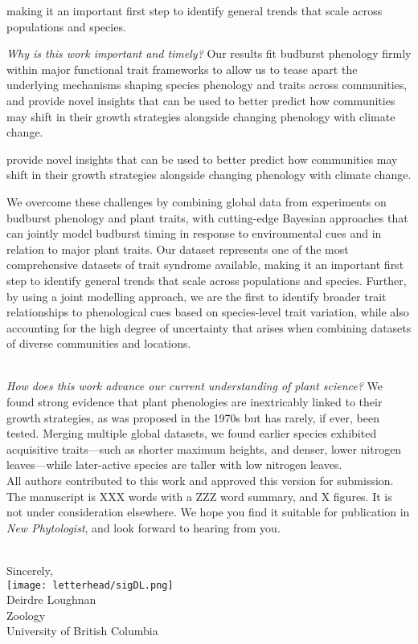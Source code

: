 \documentclass[11pt,a4paper]{article}
\begin{document}
making it an important first step to identify general trends that scale across populations and species. 

\emph{Why is this work important and timely?} Our results fit budburst phenology firmly within major functional trait frameworks to allow us to tease apart the underlying mechanisms shaping species phenology and traits across communities, and provide novel insights that can be used to better predict how communities may shift in their growth strategies alongside changing phenology with climate change. 


provide novel insights that can be used to better predict how communities may shift in their growth strategies alongside changing phenology with climate change. 


\noindent We overcome these challenges by combining global data from experiments on budburst phenology and plant traits, with cutting-edge Bayesian approaches that can jointly model budburst timing in response to environmental cues and in relation to major plant traits. Our dataset represents one of the most comprehensive datasets of trait syndrome available, making it an important first step to identify general trends that scale across populations and species. Further, by using a joint modelling approach, we are the first to identify broader trait relationships to phenological cues based on species-level trait variation, while also accounting for the high degree of uncertainty that arises when combining datasets of diverse communities and locations.

\vspace{1.5ex}\\
\emph{How does this work advance our current understanding of plant science?} We found strong evidence that plant phenologies are inextricably linked to their growth strategies, as was proposed in the 1970s but has rarely, if ever, been tested. Merging multiple global datasets, we found earlier species exhibited acquisitive traits---such as shorter maximum heights, and denser, lower nitrogen leaves---while later-active species are taller with low nitrogen leaves.
\vspace{1.5ex}\\
\noindent All authors contributed to this work and approved this version for submission. The manuscript is XXX words with a ZZZ word summary, and X figures. It is not under consideration elsewhere. We hope you find it suitable for publication in \emph{New Phytologist}, and look forward to hearing from you. 

\vspace{1.5ex}\\
\noindent Sincerely, \\
\texttt{[image: letterhead/sigDL.png]} \\
\noindent Deirdre Loughnan\\
\noindent Zoology\\
\noindent University of British Columbia

\newpage
\end{document}
